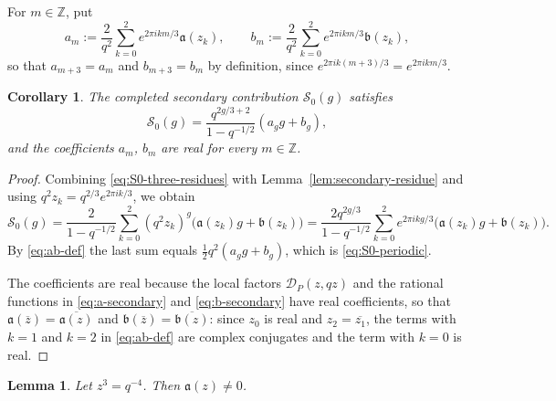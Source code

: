 \documentclass[a4paper,reqno]{amsart}
\numberwithin{equation}{section}
\newtheorem{lemma}[theorem]{Lemma}
\newtheorem{corollary}[theorem]{Corollary}
\theoremstyle{remark}
\theoremstyle{definition}
\begin{document}
For $m\in\mathbb Z$, put
\begin{equation}\label{eq:ab-def}
a_m:=\frac{2}{q^2}\sum_{k=0}^{2}e^{2\pi ikm/3}\mathfrak a(z_k),
\qquad
b_m:=\frac{2}{q^2}\sum_{k=0}^{2}e^{2\pi ikm/3}\mathfrak b(z_k),
\end{equation}
so that $a_{m+3}=a_m$ and $b_{m+3}=b_m$ by definition, since
$e^{2\pi ik(m+3)/3}=e^{2\pi ikm/3}$.

\begin{corollary}
\label{cor:S0-periodic}
The completed secondary contribution $\mathcal S_0(g)$ satisfies
\begin{equation}\label{eq:S0-periodic}
\mathcal S_0(g)
=
\frac{q^{2g/3+2}}{1-q^{-1/2}}
\left(a_gg+b_g\right),
\end{equation}
and the coefficients $a_m$, $b_m$ are real for every $m\in\mathbb Z$.
\end{corollary}

\begin{proof}
Combining \eqref{eq:S0-three-residues} with
Lemma~\ref{lem:secondary-residue} and using
$q^2z_k=q^{2/3}e^{2\pi ik/3}$, we obtain
$$
\mathcal S_0(g)
=
\frac{2}{1-q^{-1/2}}\sum_{k=0}^{2}(q^2z_k)^g
\bigl(\mathfrak a(z_k)g+\mathfrak b(z_k)\bigr)
=
\frac{2q^{2g/3}}{1-q^{-1/2}}\sum_{k=0}^{2}e^{2\pi ikg/3}
\bigl(\mathfrak a(z_k)g+\mathfrak b(z_k)\bigr).
$$
By \eqref{eq:ab-def} the last sum equals $\tfrac12q^{2}(a_gg+b_g)$, which
is \eqref{eq:S0-periodic}.

The coefficients are real because the local factors $\mathcal D_P(z,qz)$ and
the rational functions in \eqref{eq:a-secondary} and
\eqref{eq:b-secondary} have real coefficients, so that
$\mathfrak a(\overline z)=\overline{\mathfrak a(z)}$ and
$\mathfrak b(\overline z)=\overline{\mathfrak b(z)}$: since $z_0$ is real
and $z_2=\overline{z_1}$, the terms with $k=1$ and $k=2$ in
\eqref{eq:ab-def} are complex conjugates and the term with $k=0$ is real.
\end{proof}

\begin{lemma}
\label{lem:secondary-nonvanish}
Let $z^3=q^{-4}$. Then $\mathfrak a(z)\ne0$.
\end{lemma}
\end{document}
